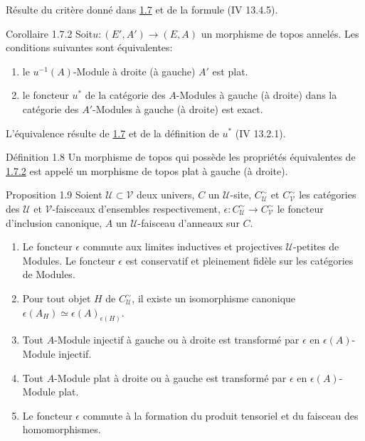 \documentclass[10pt]{../fichiers-configuration-latex/smfart}
\begin{document}
Résulte du critère donné dans \hyperref[V.prop1.7]{1.7} et de la formule (IV 13.4.5).

\begin{enonce*}{Corollaire 1.7.2}
Soit\pageoriginale $u : (E', A') \to (E, A)$ un morphisme de topos annelés. Les
conditions suivantes sont équivalentes:
\begin{enumerate}
\renewcommand{\theenumi}{\roman{enumi}}
\renewcommand{\labelenumi}{\theenumi)}
\item le $u^{-1} (A)$-Module à droite (\resp à gauche) $A'$ est
  plat.
\item le foncteur $u^{*}$ de la catégorie des $A$-Modules à gauche
  (\resp à droite) dans la catégorie des $A'$-Modules à gauche
  (\resp à droite) est exact.
\end{enumerate}
\end{enonce*}

L'équivalence résulte de \hyperref[V.prop1.7]{1.7} et de la définition de $u^\ast$ (IV
13.2.1).

\begin{enonce*}{Définition 1.8}
Un morphisme de topos  qui possède les propriétés
équivalentes de \hyperref[V.cor1.7.2]{1.7.2} est appelé un morphisme de topos plat à
gauche (\resp à droite).
\end{enonce*}

\begin{enonce*}{Proposition 1.9}
Soient $𝒰 \subset 𝒱$ deux univers, $C$ un $𝒰$-site, $C^{\sim}_{𝒰}$ et
$C^{\sim}_{𝒱}$ les catégories des
$𝒰$ et $𝒱$-faisceaux d'ensembles
respectivement, $\epsilon: C^{\sim}_{𝒰} \to C^{\sim}_{𝒱}$ le foncteur
d'inclusion canonique, $A$ un $𝒰$-faisceau d'anneaux sur $C$.
\begin{enumerate}
\renewcommand{\labelenumi}{\theenumi)}
\item Le foncteur $\epsilon$ commute aux limites inductives et
  projectives $𝒰$-petites de Modules. Le foncteur $\epsilon$ est
  conservatif et pleinement fidèle sur les catégories de Modules.

\item Pour tout objet $H$ de $C^{\sim}_{𝒰}$, il
  existe un isomorphisme
  canonique $\epsilon(A_H) \simeq \epsilon
  (A)_{\epsilon(H)}$.

\item Tout $A$-Module injectif à gauche ou à droite est
  transformé par $\epsilon$ en $\epsilon(A)$-Module injectif.

\item Tout $A$-Module plat à droite ou à gauche est transformé
  par $\epsilon$ en $\epsilon(A)$-Module plat.

\item Le foncteur $\epsilon$ commute à la formation du produit
  tensoriel et du faisceau des homomorphismes.
\end{enumerate}
\end{enonce*}
\end{document}
